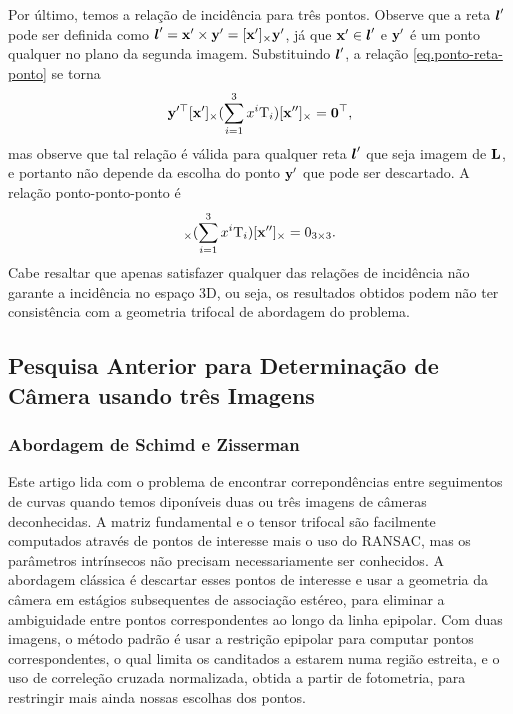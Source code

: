 Por último, temos a relação de incidência para três pontos. 
Observe que a reta $\boldsymbol{l}'$ pode ser definida como $\boldsymbol{l}'=\mathbf{x}'\times {\bf y}'=[\mathbf{x}']_\times {\bf y}'$, já que $\mathbf{x}'\in\boldsymbol{l}'$ e ${\bf y}'$ é um ponto qualquer no plano da segunda imagem. Substituindo $\boldsymbol{l}'$, a relação \ref{eq.ponto-reta-ponto} se torna 
\begin{equation*}
{\bf y}'^\top[\mathbf{x}']_\times(\sum_{i=1}^3 x^i\mbox{T}_i)[\mathbf{x}'']_\times={\bf 0}^\top,
\end{equation*}
mas observe que tal relação é válida para qualquer reta $\boldsymbol{l}'$ que seja imagem de ${\bf L}$, e portanto não depende da escolha do ponto ${\bf y}'$ que pode ser descartado. A relação ponto-ponto-ponto é
\begin{equation*}
[\x']_\times(\sum_{i=1}^3 x^i\mbox{T}_i)[\x'']_\times=0_{3\times3}.
\end{equation*}
Cabe resaltar que apenas satisfazer qualquer das relações de incidência não garante a incidência no espaço 3D, ou seja, os resultados obtidos podem não ter consistência com a geometria trifocal de abordagem do problema.




























\subsection{Pesquisa Anterior para Determinação de Câmera usando três Imagens}


\subsubsection{Abordagem de Schimd e Zisserman}

Este artigo lida com o problema de encontrar correpondências entre seguimentos de curvas quando temos diponíveis duas ou três imagens de câmeras deconhecidas. A matriz fundamental e o tensor trifocal são facilmente computados através de pontos de interesse mais o uso do RANSAC, mas os parâmetros intrínsecos não precisam necessariamente ser conhecidos. A abordagem clássica é descartar esses pontos de interesse e usar a geometria da câmera em estágios subsequentes de associação estéreo, para eliminar a ambiguidade entre pontos correspondentes ao longo da linha epipolar. Com duas imagens, o método padrão é usar a restrição epipolar para computar pontos correspondentes, o qual limita os canditados a estarem numa região estreita, e o uso de correleção cruzada normalizada, obtida a partir de fotometria, para restringir mais ainda nossas escolhas dos pontos. 

